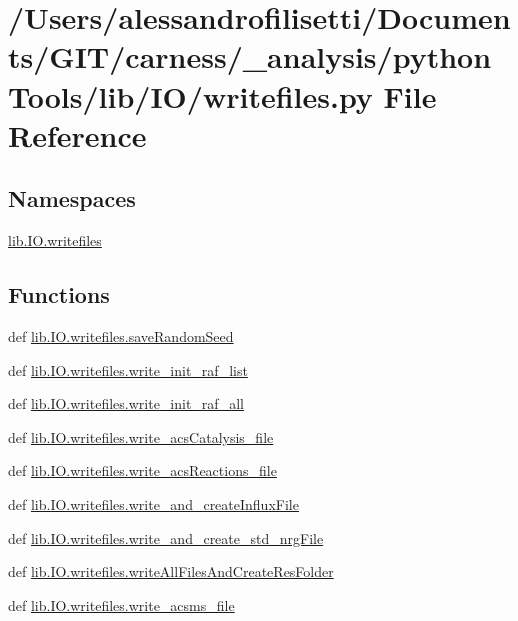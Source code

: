 \hypertarget{a00094}{\section{/\-Users/alessandrofilisetti/\-Documents/\-G\-I\-T/carness/\-\_\-analysis/python\-Tools/lib/\-I\-O/writefiles.py File Reference}
\label{a00094}
}
\subsection*{Namespaces}
\begin{DoxyCompactItemize}
\item 
\hyperlink{a00145}{lib.\-I\-O.\-writefiles}
\end{DoxyCompactItemize}
\subsection*{Functions}
\begin{DoxyCompactItemize}
\item 
def \hyperlink{a00145_a7fddc2c2879e8fedd8fbb345a19aa6f6}{lib.\-I\-O.\-writefiles.\-save\-Random\-Seed}
\item 
def \hyperlink{a00145_a33a9a95566de3841055c5dbf7fdc3505}{lib.\-I\-O.\-writefiles.\-write\-\_\-init\-\_\-raf\-\_\-list}
\item 
def \hyperlink{a00145_ad13fc2e762b8deaeb661f939e26e706f}{lib.\-I\-O.\-writefiles.\-write\-\_\-init\-\_\-raf\-\_\-all}
\item 
def \hyperlink{a00145_af18d8f2d2d0fc78ca4418866631f347b}{lib.\-I\-O.\-writefiles.\-write\-\_\-acs\-Catalysis\-\_\-file}
\item 
def \hyperlink{a00145_adbff7889ebd8786ecf5791e8a7b00d59}{lib.\-I\-O.\-writefiles.\-write\-\_\-acs\-Reactions\-\_\-file}
\item 
def \hyperlink{a00145_ae2842322fe821ae86172affce98f3aa1}{lib.\-I\-O.\-writefiles.\-write\-\_\-and\-\_\-create\-Influx\-File}
\item 
def \hyperlink{a00145_a395b3244d381850f60bf1ee95dbe84dd}{lib.\-I\-O.\-writefiles.\-write\-\_\-and\-\_\-create\-\_\-std\-\_\-nrg\-File}
\item 
def \hyperlink{a00145_a57622287d0b21cb0fe09d15345277c5c}{lib.\-I\-O.\-writefiles.\-write\-All\-Files\-And\-Create\-Res\-Folder}
\item 
def \hyperlink{a00145_a593c166784723a06f4f6a1a96890aa17}{lib.\-I\-O.\-writefiles.\-write\-\_\-acsms\-\_\-file}
\end{DoxyCompactItemize}
